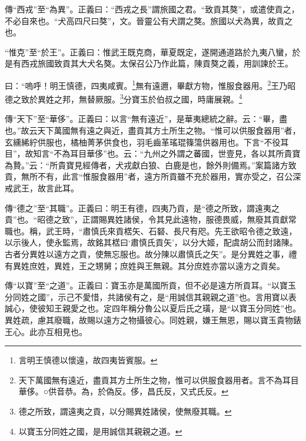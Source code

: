 {\noindent\zhuan{}\fzbyks 傳“西戎”至“為異”。正義曰：“西戎之長”謂旅國之君。“致貢其獒”，或遣使貢之，不必自來也。“犬高四尺曰獒”，文。晉靈公有犬謂之獒。旅國以犬為異，故貢之也。 \par}

{\noindent\shu{}\fzkt “惟克”至“於王”。正義曰：惟武王既克商，華夏既定，遂開通道路於九夷八蠻，於是有西戎旅國致貢其大犬名獒。太保召公乃作此篇，陳貢獒之義，用訓諫於王。 \par}

曰：“嗚呼！明王慎德，四夷咸賓。\footnote{言明王慎德以懷遠，故四夷皆賓服。}無有遠邇，畢獻方物，惟服食器用。\footnote{天下萬國無有遠近，盡貢其方土所生之物，惟可以供服食器用者。言不為耳目華侈。○供音恭。為，於偽反。侈，昌氏反，又式氏反。}王乃昭德之致於異姓之邦，無替厥服。\footnote{德之所致，謂遠夷之貢，以分賜異姓諸侯，使無廢其職。}分寶玉於伯叔之國，時庸展親。\footnote{以寶玉分同姓之國，是用誠信其親親之道。}


{\noindent\zhuan{}\fzbyks 傳“天下”至“華侈”。正義曰：以言“無有遠近”，是華夷總統之辭。云：“畢，盡也。”故云天下萬國無有遠之與近，盡貢其方土所生之物。“惟可以供服食器用”者，玄纁絺紵供服也，橘柚菁茅供食也，羽毛齒革瑤琨篠簜供器用也。下言“不役耳目”，故知言“不為耳目華侈”也。云：“九州之外謂之蕃國，世壹見，各以其所貴寶為贄。”云：“所貴寶見經傳者，犬戎獻白狼、白鹿是也，餘外則備焉。”案篇諸方致貢，無所不有，此言“惟服食器用”者，遠方所貢雖不充於器用，實亦受之，召公深戒武王，故言此耳。 \par}

{\noindent\zhuan{}\fzbyks 傳“德之”至“其職”。正義曰：明王有德，四夷乃貢，是“德之所致，謂遠夷之貢”也。“昭德之致”，正謂賜異姓諸侯，令其見此遠物，服德畏威，無廢其貢獻常職也。稱，武王時，“肅慎氏來貢楛矢、石砮、長尺有咫。先王欲昭令德之致遠，以示後人，使永監焉，故銘其楛曰‘肅慎氏貢矢’，以分大姬，配虞胡公而封諸陳。古者分異姓以遠方之貢，使無忘服也。故分陳以肅慎氏之矢”。是分異姓之事，禮有異姓庶姓，異姓，王之甥舅；庶姓與王無親。其分庶姓亦當以遠方之貢矣。 \par}

{\noindent\zhuan{}\fzbyks 傳“以寶”至“之道”。正義曰：寶玉亦是萬國所貢，但不必是遠方所貢耳。“以寶玉分同姓之國”，示己不愛惜，共諸侯有之，是“用誠信其親親之道”也。言用寶以表誠心，使彼知王親愛之也。定四年稱分魯公以夏后氏之璜，是“以寶玉分同姓”也。異姓疏，慮其廢職，故賜以遠方之物攝彼心。同姓親，嫌王無恩，賜以寶玉貴物錶王心。此亦互相見也。 \par}

